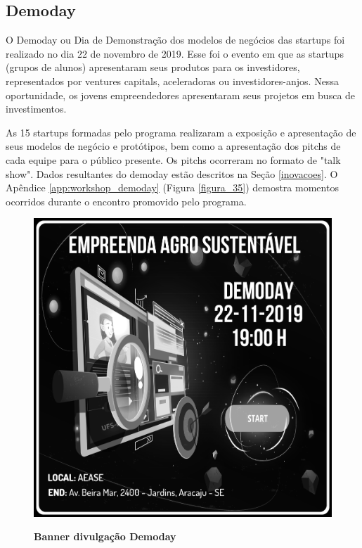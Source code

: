 \subsection{Demoday}

O Demoday ou Dia de Demonstração dos modelos de negócios das startups foi realizado no dia 22 de novembro de 2019. Esse foi o evento em que as startups (grupos de alunos) apresentaram seus produtos para os investidores, representados por ventures capitals, aceleradoras ou investidores-anjos. Nessa oportunidade, os jovens empreendedores apresentaram seus projetos em busca de investimentos.

As 15 startups formadas pelo programa realizaram a exposição e apresentação de seus modelos de negócio e protótipos, bem como a apresentação dos pitchs de cada equipe para o público presente. Os pitchs ocorreram no formato de "talk show". Dados resultantes do demoday estão descritos na Seção \ref{inovacoes}. 
O Apêndice \ref{app:workshop_demoday} (Figura \ref{figura_35}) demostra momentos ocorridos durante o encontro promovido pelo programa.



\begin{figure}[H]
\centering
\caption{\textbf{Banner divulgação Demoday}}
\includegraphics[scale=0.1]{Imagens/demoday_banner.png}
\label{fig:ods}
\end{figure}

